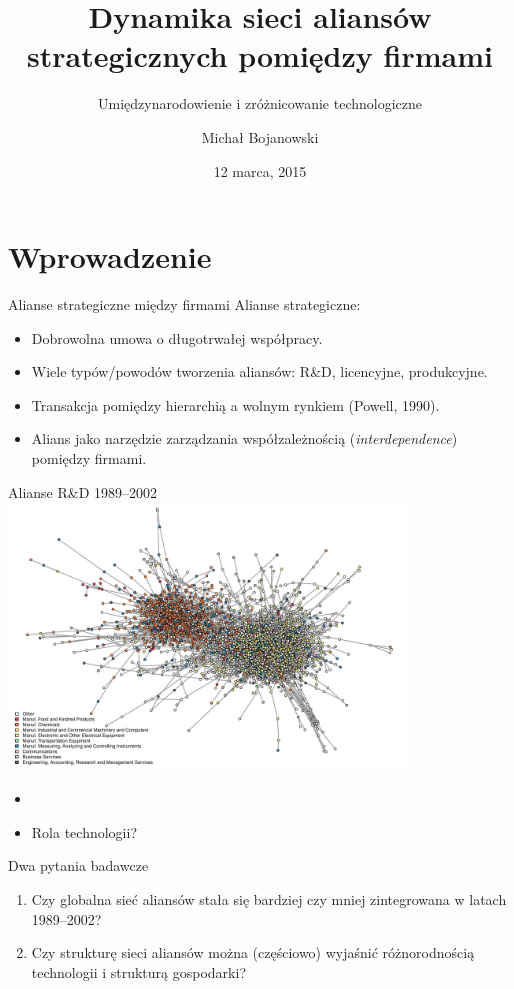 \documentclass{beamer}
\title{Dynamika sieci aliansów strategicznych pomiędzy firmami}
\subtitle{Umiędzynarodowienie i zróżnicowanie technologiczne}
\author[Michał Bojanowski <m.bojanowski@uw.edu.pl>]{Michał Bojanowski\\ \email{m.bojanowski@uw.edu.pl}}
\date{12 marca, 2015}
\institute{ICM UW}
\begin{document}
\begin{frame}
	\titlepage
\end{frame}

\section{Wprowadzenie}

\begin{frame}{Alianse strategiczne między firmami}
	Alianse strategiczne:
	\begin{itemize}
		\item Dobrowolna umowa o długotrwałej współpracy.
		\item Wiele typów/powodów tworzenia aliansów: R\&D, licencyjne, produkcyjne.
		\item Transakcja pomiędzy hierarchią a wolnym rynkiem (Powell, 1990).
		\item Alians jako narzędzie zarządzania współzależnością
			(\textit{interdependence}) pomiędzy firmami.
	\end{itemize}
\end{frame}

\begin{frame}{Alianse R\&D 1989--2002}
	\centering\includegraphics[width=0.8\textwidth]{thomson-sec2}

	\begin{itemize}
		\item 
		\item Rola technologii?
	\end{itemize}
\end{frame}



\begin{frame}{Dwa pytania badawcze}
	\begin{enumerate}
		\item Czy globalna sieć aliansów stała się bardziej czy mniej zintegrowana
			w latach 1989--2002?
		\item Czy strukturę sieci aliansów można (częściowo) wyjaśnić
			różnorodnością technologii i strukturą gospodarki?
	\end{enumerate}
\end{frame}
\end{document}
